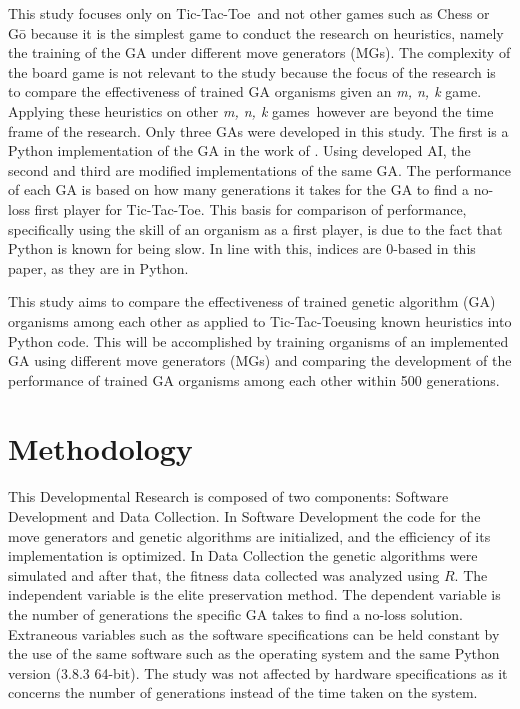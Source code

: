 \documentclass{strrespaper-journ}
\newcommand{\mnk}{\textit{m, n, k} game}
\newcommand{\mnkpl}{\textit{m, n, k} games}
\newcommand{\ttt}{Tic-Tac-Toe}
\begin{document}
		This study focuses only on \ttt\ and not other games such as Chess or G\=o because it is the simplest game to conduct the research on heuristics, namely the training of the GA under different move generators (MGs).
		The complexity of the board game is not relevant to the study because the focus of the research is to compare the effectiveness of trained GA organisms given an \mnk.
		Applying these heuristics on other \mnkpl\ however are beyond the time frame of the research.
		Only three GAs were developed in this study.
		The first is a Python implementation of the GA in the work of \textcite{bhattSearchNolossStrategies2008}.
		Using developed AI, the second and third are modified implementations of the same GA.
		The performance of each GA is based on how many generations it takes for the GA to find a no-loss first player for \ttt.
		This basis for comparison of performance, specifically using the skill of an organism as a first player, is due to the fact that Python is known for being slow.
		In line with this, indices are 0-based in this paper, as they are in Python.

		This study aims to compare the effectiveness of trained genetic algorithm (GA) organisms among each other as applied to \ttt using known heuristics into Python code.
		This will be accomplished by training organisms of an implemented GA using different move generators (MGs) and comparing the development of the performance of trained GA organisms among each other within 500 generations.

	\section{Methodology}
		This Developmental Research is composed of two components: Software Development and Data Collection.
		In Software Development the code for the move generators and genetic algorithms are initialized, and the efficiency of its implementation is optimized.
		In Data Collection the genetic algorithms were simulated and after that, the fitness data collected was analyzed using $R$.
		The independent variable is the elite preservation method.
		The dependent variable is the number of generations the specific GA takes to find a no-loss solution.
		Extraneous variables such as the software specifications can be held constant by the use of the same software such as the operating system and the same Python version (3.8.3 64-bit).
		The study was not affected by hardware specifications as it concerns the number of generations instead of the time taken on the system.
\end{document}
